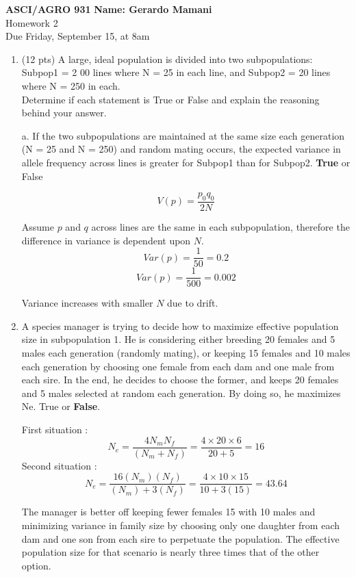 \documentclass[a4paper, 11pt]{article}
\begin{document}
  \noindent
\large\textbf{ASCI/AGRO 931} \hfill \textbf{Name: Gerardo Mamani} \\
\normalsize Homework 2 \hfill  \\
Due Friday, September 15, at 8am \hfill 

\begin{enumerate}

\item (12 pts) A large, ideal population is divided into two subpopulations:  Subpop1 = 2
00 lines where N = 25 in each line, and Subpop2 = 20 lines where N = 250 in each. \\

Determine if each statement is  True or False and explain the reasoning behind your answer.

\subitem a. If the two subpopulations are maintained at the same size each generation (N = 25 and N = 250) and random mating occurs, the expected variance in allele frequency across lines is greater for Subpop1 than for Subpop2. \textbf{True} or False

\[V(p)=\frac{p_{0}q_{0}}{2N}\]

Assume $p$ and $q$ across lines are the same in each subpopulation, therefore the difference in variance is dependent upon $N$.
\[Var(p) = \frac{1}{50} = 0.2\]
\[Var(p) = \frac{1}{500} = 0.002\]

Variance increases with smaller $N$ due to drift.

\item A species manager is trying to decide how to maximize effective population size in subpopulation 1. He is considering either breeding 20 females and 5 males each generation (randomly mating), or keeping 15 females and 10 males each generation by choosing one female from each dam and one male from each sire. In the end, he decides to choose the former, and keeps 20 females and 5 males selected at random each generation. By doing so, he maximizes Ne. True or \textbf{False}.

First situation : \[N_e=\frac{4N_mN_f}{(N_m + N_f)}=\frac{4\times 20 \times 6}{20 + 5}= 16\]
Second situation : \[N_e=\frac{16(N_m)(N_f)}{(N_m) + 3(N_f)}=\frac{4\times 10 \times 15}{10 + 3(15)}= 43.64\]

The manager is better off keeping fewer females 15 with 10 males and minimizing variance in family size by choosing only one daughter from each dam and one son from each sire to perpetuate the population. The effective population size for that scenario is nearly three times that of the other option.


\end{enumerate}
\end{document}
